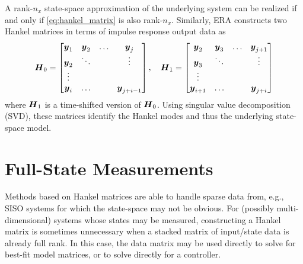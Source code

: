 A rank-$n_{x}$ state-space approximation of the underlying system can be realized if and only if \eqref{eq:hankel_matrix} is also rank-$n_{x}$.  Similarly, ERA constructs two Hankel matrices in terms of impulse response output data as
\begin{equation}
\label{eq:era_hankel_matrices}
\begin{aligned}
    \vb*{H}_{0} = 
    \begin{bmatrix}
        \vb*{y}_{1} & \vb*{y}_{2} & \ldots & \vb*{y}_{j}\\
        \vb*{y}_{2} & \ddots &  & \vdots\\
        \vdots & & & \\
        \vb*{y}_{i} & \ldots &  & \vb*{y}_{j+i-1}
    \end{bmatrix}, \hspace{10pt}
    \vb*{H}_{1} = 
    \begin{bmatrix}
        \vb*{y}_{2} & \vb*{y}_{3} & \ldots & \vb*{y}_{j+1}\\
        \vb*{y}_{3} & \ddots &  & \vdots\\
        \vdots & & & \\
        \vb*{y}_{i+1} & \ldots &  & \vb*{y}_{j+i}
    \end{bmatrix}
\end{aligned}
\end{equation}
where $\vb*{H}_{1}$ is a time-shifted version of $\vb*{H}_{0}$.  Using singular value decomposition (SVD), these matrices identify the Hankel modes and thus the underlying state-space model.

\section{Full-State Measurements}
Methods based on Hankel matrices are able to handle sparse data from, e.g., SISO systems for which the state-space may not be obvious.  For (possibly multi-dimensional) systems whose states may be measured, constructing a Hankel matrix is sometimes unnecessary when a stacked matrix of input/state data is already full rank.  In this case, the data matrix may be used directly to solve for best-fit model matrices, or to solve directly for a controller.

